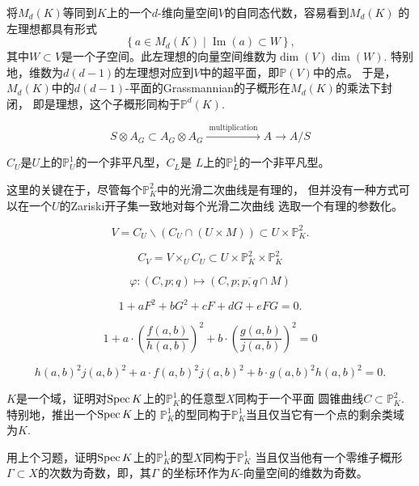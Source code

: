 将$M_d(K)$等同到$K$上的一个$d$-维向量空间$V$的自同态代数，容易看到$M_d(K)$
的左理想都具有形式
\[
    \left\{a \in M_d(K) \mid \operatorname{Im}(a) \subset W\right\},
\]
其中$W\subset V$是一个子空间。此左理想的向量空间维数为$\dim(V)\dim(W)$.
特别地，维数为$d(d-1)$的左理想对应到$V$中的超平面，即$\mathbb P(V)$中的点。
于是，$M_d(K)$中的$d(d-1)$-平面的Grassmannian的子概形在$M_d(K)$的乘法下封闭，
即是理想，这个子概形同构于$\mathbb P^d(K)$.

\[
    S \otimes A_G \subset A_G \otimes A_G \xrightarrow{\text { multiplication }}
     A \longrightarrow A / S
\]



\begin{pro}\label{pro:4.84}
    $C_U$是$U$上的$\mathbb P_U^1$的一个非平凡型，$C_L$是
    $L$上的$\mathbb P_L^1$的一个非平凡型。
\end{pro}

这里的关键在于，尽管每个$\mathbb P_K^2$中的光滑二次曲线是有理的，
但并没有一种方式可以在一个$U$的Zariski开子集一致地对每个光滑二次曲线
选取一个有理的参数化。

\[
    V=C_U \backslash\left(C_U \cap(U \times M)\right) \subset U \times \mathbb{P}_K^2 .
\]

\[
    C_V=V \times_U C_U \subset U \times \mathbb{P}_K^2 \times \mathbb{P}_K^2
\]


\[
    \varphi:(C, p ; q) \longmapsto(C, p ; \overline{p, q} \cap M)
\]


\[
    1+a F^2+b G^2+c F+d G+e F G=0 .
\]

\[
    1+a \cdot\left(\frac{f(a, b)}{h(a, b)}\right)^2+b \cdot\left(\frac{g(a, b)}{j(a, b)}\right)^2=0
\]

\[
    h(a, b)^2 j(a, b)^2+a \cdot f(a, b)^2 j(a, b)^2+b \cdot g(a, b)^2 h(a, b)^2=0 .
\]

\nottran

\begin{exe}\label{exe:4.86}
    $K$是一个域，证明对$\operatorname{Spec} K$上的$\mathbb P_K^1$的任意型$X$同构于一个平面
    圆锥曲线$C\subset \mathbb P_K^2$. 特别地，推出一个$\operatorname{Spec} K$上的
    $\mathbb P_K^1$的型同构于$\mathbb P_K^1$当且仅当它有一个点的剩余类域为$K$.
\end{exe}

\begin{exe}\label{exe:4.87}
    用上个习题，证明$\operatorname{Spec} K$上的$\mathbb P_K^1$的型$X$同构于$\mathbb P_K^1$
    当且仅当他有一个零维子概形$\Gamma\subset X$的次数为奇数，即，其$\Gamma$
    的坐标环作为$K$-向量空间的维数为奇数。
\end{exe}


